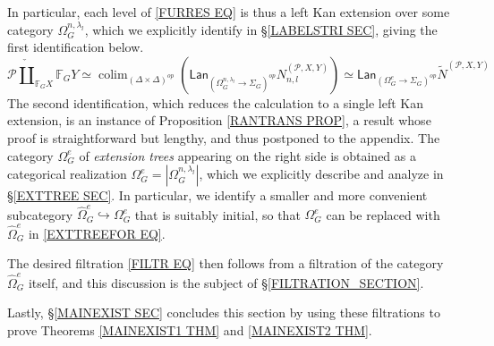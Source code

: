 \documentclass[a4paper,10pt
,draft
]{article}%
\numberwithin{equation}{section}
\numberwithin{figure}{section}
\theoremstyle{definition} %
\DeclareMathOperator{\colim}{colim}%
\newcommand{\1}{\ensuremath{\mathbbm 1}}%
\begin{document}
In particular, each level of 
\eqref{FURRES EQ}
is thus a left Kan extension over some category
$\Omega_G^{n,\lambda_l}$, which we explicitly identify in 
\S \ref{LABELSTRI SEC}, giving the first identification below.
\begin{equation}\label{EXTTREEFOR EQ}
	\mathcal{P} \mathbin{\check{\coprod}}_{\mathbb{F}_G X} \mathbb{F}_G Y 
\simeq 
	\colim_{(\Delta \times \Delta)^{op}}
	\left(
	\mathsf{Lan}_{\left( \Omega_{G}^{n,\lambda_l} \to \Sigma_G \right)^{op}}
	N_{n,l}^{(\mathcal{P},X,Y)}
	\right)
\simeq 
	\mathsf{Lan}_{\left( \Omega_{G}^{e} \to \Sigma_G \right)^{op}}
	\tilde{N}^{(\mathcal{P},X,Y)}
\end{equation}
The second identification, 
which reduces the calculation to a single left Kan extension, is an instance of 
Proposition \ref{RANTRANS PROP}, 
a result whose proof is straightforward but lengthy, 
and thus postponed to the appendix.
The category $\Omega_G^e$ of \textit{extension trees}
appearing on the right side
is obtained as a categorical realization
$\Omega_G^e = |\Omega_{G}^{n,\lambda_l}|$,
which we explicitly describe and analyze in 
\S \ref{EXTTREE SEC}.
In particular, we identify a smaller and more convenient
subcategory 
$\widehat{\Omega}_G^e \hookrightarrow \Omega_G^e$
that is suitably initial,
so that $\Omega_G^e$ can be replaced with $\widehat{\Omega}_G^e$
in \eqref{EXTTREEFOR EQ}.

The desired filtration \eqref{FILTR EQ}
then follows from a filtration of the 
category $\widehat{\Omega}_G^e$ itself,
and this discussion is the subject of
\S \ref{FILTRATION_SECTION}.

Lastly, \S \ref{MAINEXIST SEC} concludes this section
by using these filtrations to prove 
Theorems \ref{MAINEXIST1 THM} and \ref{MAINEXIST2 THM}.

\end{document}
